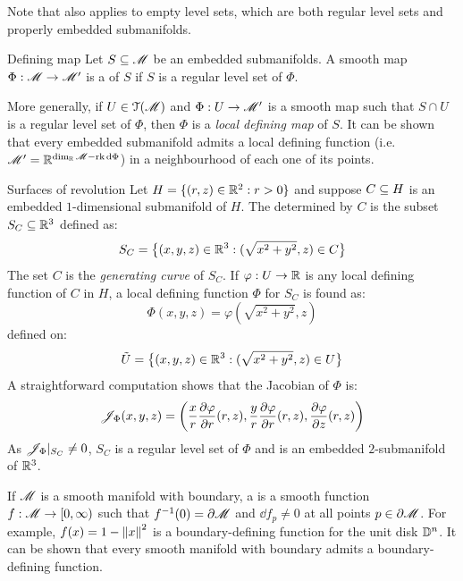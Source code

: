 Note that  also applies to empty level sets, which are both regular level sets and properly embedded submanifolds.

\begin{definition}{Defining map}{}
  Let $ S \subseteq \mathscr{M} $ be an embedded submanifolds. A smooth map $ \Phi : \mathscr{M} \rightarrow \mathscr{M}' $ is a  of $ S $ if $ S $ is a regular level set of $ \Phi $.
\end{definition}

More generally, if $ U \in \EuScript{T}(\mathscr{M}) $ and $ \Phi : U \rightarrow \mathscr{M}' $ is a smooth map such that $ S \cap U $ is a regular level set of $ \Phi $, then $ \Phi $ is a \emph{local defining map} of $ S $. It can be shown that every embedded submanifold admits a local defining function (i.e. $ \mathscr{M}' = \mathbb{R}^{\dim_{\mathbb{R}} \mathscr{M} - \operatorname{rk} \mathrm{d} \Phi} $) in a neighbourhood of each one of its points.

\begin{example}{Surfaces of revolution}{}
  Let $ H = \{(r,z) \in \mathbb{R}^2 : r > 0\} $ and suppose $ C \subseteq H $ is an embedded $ 1 $-dimensional submanifold of $ H $. The  determined by $ C $ is the subset $ S_C \subseteq \mathbb{R}^3 $ defined as:
  \begin{equation*}
    S_C = \big\{ (x,y,z) \in \mathbb{R}^3 : (\sqrt{x^2 + y^2} , z) \in C \big\}
  \end{equation*}
  The set $ C $ is the \emph{generating curve} of $ S_C $. If $ \varphi : U \rightarrow \mathbb{R} $ is any local defining function of $ C $ in $ H $, a local defining function $ \Phi $ for $ S_C $ is found as:
  \begin{equation*}
    \Phi(x,y,z) = \varphi(\sqrt{x^2 + y^2} , z)
  \end{equation*}
  defined on:
  \begin{equation*}
    \tilde{U} = \big\{ (x,y,z) \in \mathbb{R}^3 : (\sqrt{x^2 + y^2} , z) \in U \big\}
  \end{equation*}
  A straightforward computation shows that the Jacobian of $ \Phi $ is:
  \begin{equation*}
    \mathscr{J}_{\Phi}(x,y,z) = \left( \frac{x}{r} \frac{\partial \varphi}{\partial r} (r,z) , \frac{y}{r} \frac{\partial \varphi}{\partial r} (r,z) , \frac{\partial \varphi}{\partial z} (r,z) \right)
  \end{equation*}
  As $ \mathscr{J}_{\Phi} \vert_{S_C} \neq 0 $, $ S_C $ is a regular level set of $ \Phi $ and is an embedded $ 2 $-submanifold of $ \mathbb{R}^3 $.
\end{example}

If $ \mathscr{M} $ is a smooth manifold with boundary, a  is a smooth function $ f : \mathscr{M} \rightarrow [0,\infty) $ such that $ f^{-1}(0) = \partial \mathscr{M} $ and $ \dd f_p \neq 0 $ at all points $ p \in \partial \mathscr{M} $. For example, $ f(x) = 1 - \left\lVert x\right\rVert^2 $ is a boundary-defining function for the unit disk $ \mathbb{D}^{n} $. It can be shown that every smooth manifold with boundary admits a boundary-defining function.

